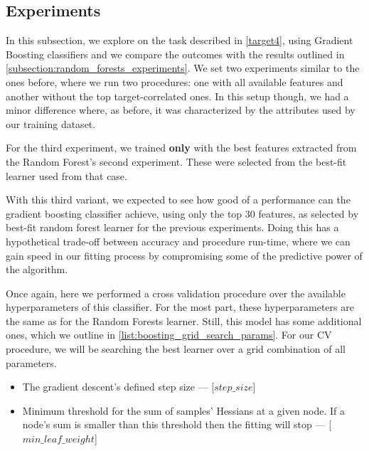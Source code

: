 \subsection{Experiments}\label{subsection:boosting_experiments}


In this subsection, we explore on the task described in \cref{target4}, using Gradient Boosting classifiers and we compare the outcomes with the results outlined in \cref{subsection:random_forests_experiments}.
We set two experiments similar to the ones before, where we run two procedures: one with all available features and another without the top target-correlated ones.
In this setup though, we had a minor difference where, as before, it was characterized by the attributes used by our training dataset.

For the third experiment, we trained \textbf{only} with the best features extracted from the Random Forest's second experiment.
These were selected from the best-fit learner used from that case.

With this third variant, we expected to see how good of a performance can the gradient boosting classifier achieve, using only the top 30 features, as selected by best-fit random forest learner for the previous experiments.
Doing this has a hypothetical trade-off between accuracy and procedure run-time, where we can gain speed in our fitting process by compromising some of the predictive power of the algorithm.

Once again, here we performed a cross validation procedure over the available hyperparameters of this classifier.
For the most part, these hyperparameters are the same as for the Random Forests learner.
Still, this model has some additional ones, which we outline in \cref{list:boosting_grid_search_params}.
For our CV procedure, we will be searching the best learner over a grid combination of all parameters.

\begin{itemize}

  \item The gradient descent's defined step size  --- [$step\_size$]
  \item Minimum threshold for the sum of samples' Hessians at a given node.
  If a node's sum is smaller than this threshold then the fitting will stop  --- [$min\_leaf\_weight$]
\label{list:boosting_grid_search_params}
\end{itemize}


